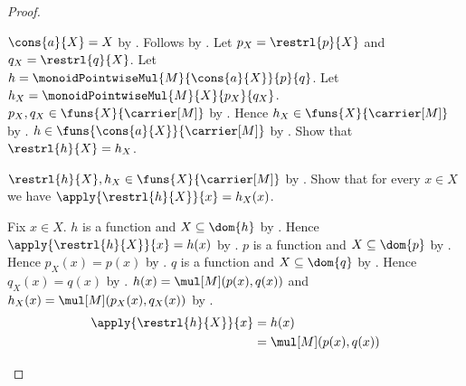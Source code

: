 \begin{proof}
\begin{subproof}
\begin{subproof}
\begin{byCase}
                $\cons{a}{X}=X$ by .
                Follows by \auto.
                Let $p_X=\restrl{p}{X}$ and $q_X=\restrl{q}{X}$.
                Let $h=\monoidPointwiseMul{M}{\cons{a}{X}}{p}{q}$.
                Let $h_X=\monoidPointwiseMul{M}{X}{p_X}{q_X}$.
                $p_X,q_X\in\funs{X}{\carrier[M]}$ by
                    .
                Hence $h_X\in\funs{X}{\carrier[M]}$ by
                    .
                $h\in\funs{\cons{a}{X}}{\carrier[M]}$ by
                    .
                Show that $\restrl{h}{X}=h_X$.
                \begin{subproof}
                    $\restrl{h}{X},h_X\in
                        \funs{X}{\carrier[M]}$ by
                        .
                    Show that for every $x\in X$ we have
                        $\apply{\restrl{h}{X}}{x}=h_X(x)$.
                    \begin{subproof}
                        Fix $x\in X$.
                        $h$ is a function and $X\subseteq\dom{h}$ by
                            .
                        Hence $\apply{\restrl{h}{X}}{x}=h(x)$ by
                            .
                        $p$ is a function and $X\subseteq\dom{p}$ by
                            .
                        Hence $p_X(x)=p(x)$ by
                            .
                        $q$ is a function and $X\subseteq\dom{q}$ by
                            .
                        Hence $q_X(x)=q(x)$ by
                            .
                        $h(x)=\mul[M](p(x),q(x))$ and
                            $h_X(x)=\mul[M](p_X(x),q_X(x))$ by
                            .
                        \begin{align*}
                            \apply{\restrl{h}{X}}{x}
                                &= h(x)
                                \\
                                &= \mul[M](p(x),q(x))

\end{align*}
\end{subproof}
\end{subproof}
\end{byCase}
\end{subproof}
\end{subproof}
\end{proof}
